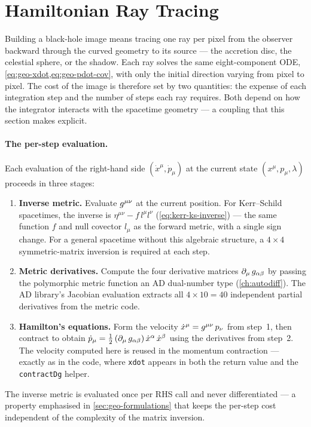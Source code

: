 \section{Hamiltonian Ray Tracing}
\label{sec:geo-raytracing}

Building a black-hole image means tracing one ray per pixel from the
observer backward through the curved geometry to its source --- the
accretion disc, the celestial sphere, or the shadow.  Each ray solves
the same eight-component ODE,
\cref{eq:geo-xdot,eq:geo-pdot-cov}, with only the initial
direction varying from pixel to pixel.  The cost of the image is
therefore set by two quantities: the expense of each integration step
and the number of steps each ray requires.  Both depend on how the
integrator interacts with the spacetime geometry --- a coupling that
this section makes explicit.

\paragraph{The per-step evaluation.}

Each evaluation of the right-hand side
$(\dot{x}^\mu, \dot{p}_\mu)$ at the current state
$(x^\mu, p_\mu, \lambda)$ proceeds in three stages:
%
\begin{enumerate}
\item \textbf{Inverse metric.}  Evaluate $g^{\mu\nu}$ at the
  current position.  For Kerr--Schild spacetimes, the inverse is
  $\eta^{\mu\nu} - f\,l^\mu l^\nu$
  (\cref{eq:kerr-ks-inverse}) --- the same function $f$ and null
  covector $l_\mu$ as the forward metric, with a single sign change.
  For a general spacetime without this algebraic structure, a
  $4 \times 4$ symmetric-matrix inversion is required at each step.
\item \textbf{Metric derivatives.}  Compute the four derivative
  matrices $\partial_{\mu}\,g_{\alpha\beta}$ by passing the polymorphic
  metric function an AD dual-number type
  (\cref{ch:autodiff}).  The AD library's Jacobian
  evaluation extracts all $4 \times 10 = 40$ independent partial
  derivatives from the metric code.
\item \textbf{Hamilton's equations.}  Form the velocity
  $\dot{x}^\mu = g^{\mu\nu}\,p_\nu$ from step~1, then contract
  to obtain $\dot{p}_\mu = \tfrac{1}{2}\,
  (\partial_{\mu}\,g_{\alpha\beta})\,\dot{x}^\alpha\,\dot{x}^\beta$ using
  the derivatives from step~2.  The velocity computed here is reused
  in the momentum contraction --- exactly as in the code, where
  \texttt{xdot} appears in both the return value and the
  \texttt{contractDg} helper.
\end{enumerate}
%
The inverse metric is evaluated once per RHS call and never
differentiated --- a property emphasised in \cref{sec:geo-formulations}
that keeps the per-step cost independent of the complexity of the
matrix inversion.

